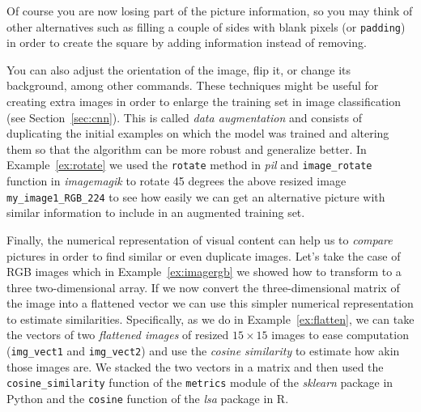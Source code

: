 Of course you are now losing part of the picture information, so you may think of other alternatives such as filling a couple of sides with blank pixels (or \texttt{padding}) in order to create the square by adding information instead of removing.


You can also adjust the orientation of the image, flip it, or change its background, among other commands. These techniques might be useful for creating extra images in order to enlarge the training set in image classification (see Section~\ref{sec:cnn}). This is called \textit{data augmentation} and consists of duplicating the initial examples on which the model was trained and altering them so that the algorithm can be more robust and generalize better. In Example~\ref{ex:rotate} we used the \texttt{rotate} method in \emph{pil} and \texttt{image\_rotate} function in \emph{imagemagik}
to rotate 45 degrees the above resized image \texttt{my\_image1\_RGB\_224} to see how easily we can get an alternative picture with similar information to include in an augmented training set.


Finally, the numerical representation of visual content can help us to \textit{compare} pictures in order to find similar or even duplicate images. Let's take the case of RGB images which in Example~\ref{ex:imagergb} we showed how to transform to a three two-dimensional array. If we now convert the three-dimensional matrix of the image into a flattened vector we can use this simpler numerical representation to estimate similarities. Specifically, as we do in Example~\ref{ex:flatten}, we can take the vectors of two \textit{flattened images} of resized $15 \times 15$ images to ease computation (\texttt{img\_vect1} and \texttt{img\_vect2}) and use the \textit{cosine similarity} to estimate how akin those images are. We stacked the two vectors in a matrix and then used the \texttt{cosine\_similarity} function of the \texttt{metrics} module of the  \emph{sklearn} package in Python and the \texttt{cosine} function of the \emph{lsa} package in R.


